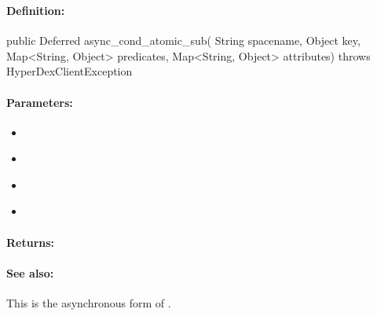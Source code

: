 \pagebreak
\subsubsection{}
\label{api:java:async_cond_atomic_sub}


\paragraph{Definition:}
\begin{javacode}
public Deferred async_cond_atomic_sub(
        String spacename,
        Object key,
        Map<String, Object> predicates,
        Map<String, Object> attributes) throws HyperDexClientException
\end{javacode}

\paragraph{Parameters:}
\begin{itemize}[noitemsep]
\item {}\\

\item {}\\

\item {}\\

\item {}\\

\end{itemize}

\paragraph{Returns:}


\paragraph{See also:}  This is the asynchronous form of .

\pagebreak
